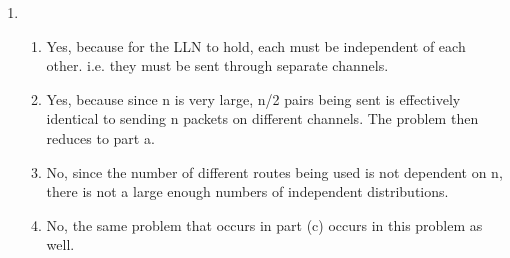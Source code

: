 \documentclass[a4paper]{article}
\newcommand{\<}{\langle}
\renewcommand{\>}{\rangle}
\renewcommand{\^}{\wedge}
\begin{document}
\begin{enumerate}
\begin{enumerate}
        \end{enumerate}
    \item 
        \begin{enumerate}
            \item Yes, because for the LLN to hold, each must be independent of each other. i.e. they must be sent through separate channels.
            \item Yes, because since n is very large, n/2 pairs being sent is effectively identical to sending n packets on different channels. The problem then reduces to part a.
            \item No, since the number of different routes being used is not dependent on n, there is not a large enough numbers of independent distributions. 
            \item No, the same problem that occurs in part (c) occurs in this problem as well. 
        \end{enumerate}
\end{enumerate}
\end{document}
